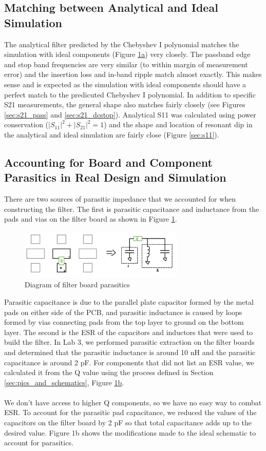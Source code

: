 \documentclass[letterpaper,12pt]{article}
\begin{document}
\subsection{Matching between Analytical and Ideal Simulation}
The analytical filter predicted by the Chebyshev I polynomial matches the simulation with ideal components (Figure \hyperref[sec:pics_and_schematics]{1a}) very closely. The passband edge and stop band frequencies are very similar (to within margin of measurement error) and the insertion loss and in-band ripple match almost exactly. This makes sense and is expected as the simulation with ideal components should have a perfect match to the predicuted Chebyshev I polynomial. In addition to specific S21 measurements, the general shape also matches fairly closely (see Figures \ref{sec:s21_pass} and \ref{sec:s21_dcstop}). Analytical S11 was calculated using power conservation ($|S_{11}|^2 + |S_{21}|^2 = 1$) and the shape and location of resonant dip in the analytical and ideal simulation are fairly close (Figure \ref{sec:s11}).
\subsection{Accounting for Board and Component Parasitics in Real Design and Simulation}
There are two sources of parasitic impedance that we accounted for when constructing the filter. The first is parasitic capacitance and inductance from the pads and vias on the filter board as shown in Figure \ref{fig:9.board_parasitics}.

\begin{figure}[H]
  \centering \includegraphics[width=0.7\textwidth]{figures/9.parasitics}
  \caption{Diagram of filter board parasitics \label{fig:9.board_parasitics}}
\end{figure}
\noindent
Parasitic capacitance is due to the parallel plate capacitor formed by the metal pads on either side of the PCB, and parasitic inductance is caused by loops formed by vias connecting pads from the top layer to ground on the bottom layer. The second is the ESR of the capacitors and inductors that were used to build the filter. In Lab 3, we performed parasitic extraction on the filter boards and determined that the parasitic inductance is around 10 nH and the parasitic capacitance is around 2 pF. For components that did not list an ESR value, we calculated it from the Q value using the process defined in Section \ref{sec:pics_and_schematics}, Figure \hyperref[sec:pics_and_schematics]{1b}.
\\
\\
We don't have access to higher Q components, so we have no easy way to combat ESR. To account for the parasitic pad capacitance, we reduced the values of the capacitors on the filter board by 2 pF so that total capacitance adds up to the desired value. Figure 1b shows the modifications made to the ideal schematic to account for parasitics.
\end{document}
